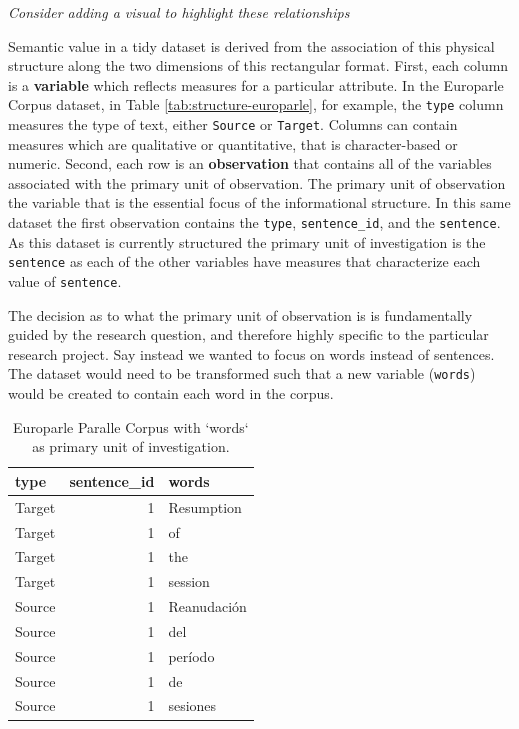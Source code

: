 \documentclass[
]{article}
\begin{document}
\emph{Consider adding a visual to highlight these relationships}

Semantic value in a tidy dataset is derived from the association of this physical structure along the two dimensions of this rectangular format. First, each column is a \textbf{variable} which reflects measures for a particular attribute. In the Europarle Corpus dataset, in Table \ref{tab:structure-europarle}, for example, the \texttt{type} column measures the type of text, either \texttt{Source} or \texttt{Target}. Columns can contain measures which are qualitative or quantitative, that is character-based or numeric. Second, each row is an \textbf{observation} that contains all of the variables associated with the primary unit of observation. The primary unit of observation the variable that is the essential focus of the informational structure. In this same dataset the first observation contains the \texttt{type}, \texttt{sentence\_id}, and the \texttt{sentence}. As this dataset is currently structured the primary unit of investigation is the \texttt{sentence} as each of the other variables have measures that characterize each value of \texttt{sentence}.

The decision as to what the primary unit of observation is is fundamentally guided by the research question, and therefore highly specific to the particular research project. Say instead we wanted to focus on words instead of sentences. The dataset would need to be transformed such that a new variable (\texttt{words}) would be created to contain each word in the corpus.

\begin{table}

\caption{\label{tab:tidy-words-europarle}Europarle Paralle Corpus with `words` as primary unit of investigation.}
\centering
\begin{tabular}[t]{lrl}
\toprule
type & sentence\_id & words\\
\midrule
Target & 1 & Resumption\\
Target & 1 & of\\
Target & 1 & the\\
Target & 1 & session\\
Source & 1 & Reanudación\\
\addlinespace
Source & 1 & del\\
Source & 1 & período\\
Source & 1 & de\\
Source & 1 & sesiones\\
\bottomrule
\end{tabular}
\end{table}
\end{document}
